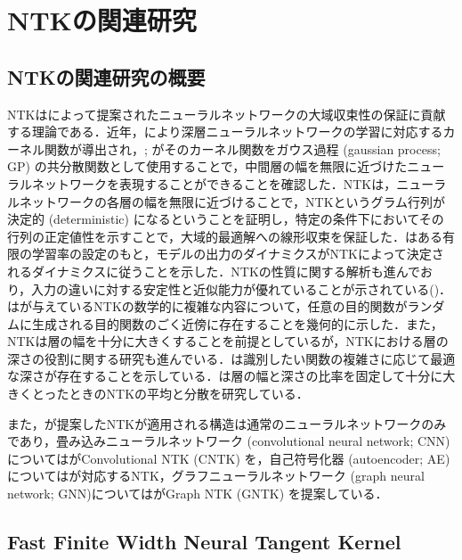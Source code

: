 \section{NTKの関連研究}
\subsection{NTKの関連研究の概要}
NTKは\citet{jacot2018neural}によって提案されたニューラルネットワークの大域収束性の保証に貢献する理論である．近年，\citet{cho2009kernel}により深層ニューラルネットワークの学習に対応するカーネル関数が導出され，\citet{neal2012bayesian};  \citet{lee2018deep}がそのカーネル関数をガウス過程 (gaussian process; GP) の共分散関数として使用することで，中間層の幅を無限に近づけたニューラルネットワークを表現することができることを確認した．NTKは，ニューラルネットワークの各層の幅を無限に近づけることで，NTKというグラム行列が決定的 (deterministic) になるということを証明し，特定の条件下においてその行列の正定値性を示すことで，大域的最適解への線形収束を保証した．\citet{lee2019wide}はある有限の学習率の設定のもと，モデルの出力のダイナミクスがNTKによって決定されるダイナミクスに従うことを示した．NTKの性質に関する解析も進んでおり，入力の違いに対する安定性と近似能力が優れていることが示されている(\citealp{bietti2019inductive})．\citet{amari2020atf}は\citet{jacot2018neural}が与えているNTKの数学的に複雑な内容について，任意の目的関数がランダムに生成される目的関数のごく近傍に存在することを幾何的に示した．また，NTKは層の幅を十分に大きくすることを前提としているが，NTKにおける層の深さの役割に関する研究も進んでいる．\citet{yang2019fine}は識別したい関数の複雑さに応じて最適な深さが存在することを示している．\citet{hanin2019finite}は層の幅と深さの比率を固定して十分に大きくとったときのNTKの平均と分散を研究している．

また，\citet{jacot2018neural}が提案したNTKが適用される構造は通常のニューラルネットワークのみであり，畳み込みニューラルネットワーク (convolutional neural network; CNN)については\citet{Arora2019OnEC}がConvolutional NTK (CNTK) を，自己符号化器 (autoencoder; AE)については\citet{nguyen2019benefits}が対応するNTK，グラフニューラルネットワーク (graph neural network; GNN)については\citet{du2019graph}がGraph NTK (GNTK) を提案している．

\subsection{Fast Finite Width Neural Tangent Kernel}
